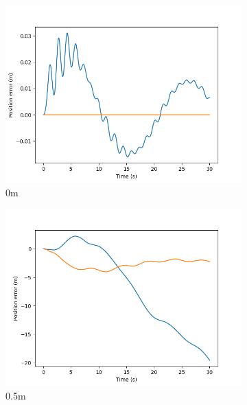 \documentclass[class=article, crop=false]{standalone}
\begin{document}
\begin{figure}
    \centering
    \begin{subfigure}[b]{0.48\textwidth}
        \centering
        \includegraphics{scenario1/rov-50m/0.0m/rov_position_error_uncontrolled}
        \caption{0m}
        \label{}
    \end{subfigure}
    \hfill
    \begin{subfigure}[b]{0.48\textwidth}
        \centering
        \includegraphics{scenario1/rov-50m/0.5m/rov_position_error_uncontrolled}
        \caption{0.5m}
        \label{}
    \end{subfigure}
    \vfill
    \begin{subfigure}[b]{0.48\textwidth}
        \centering

\end{subfigure}
\end{figure}
\end{document}
